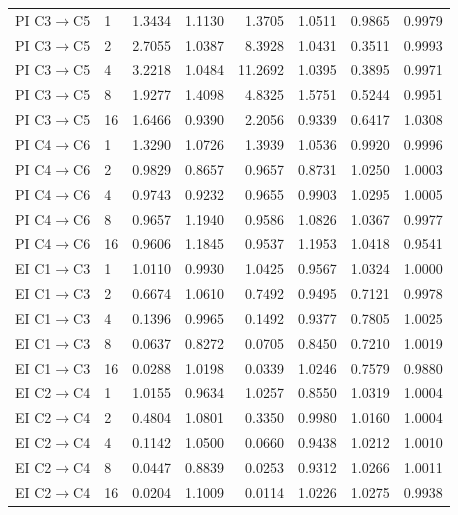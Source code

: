 \begin{table}[p]
\begin{tabular*}{\linewidth}{@{\extracolsep{\fill}}llrrrrrr@{}}
\midrule
PI C3$\to$C5 & 1 & 1.3434 & 1.1130 & 1.3705 & 1.0511 & 0.9865 & 0.9979\\
PI C3$\to$C5 & 2 & 2.7055 & 1.0387 & 8.3928 & 1.0431 & 0.3511 & 0.9993\\
PI C3$\to$C5 & 4 & 3.2218 & 1.0484 & 11.2692 & 1.0395 & 0.3895 & 0.9971\\
PI C3$\to$C5 & 8 & 1.9277 & 1.4098 & 4.8325 & 1.5751 & 0.5244 & 0.9951\\
PI C3$\to$C5 & 16 & 1.6466 & 0.9390 & 2.2056 & 0.9339 & 0.6417 & 1.0308\\
\midrule
PI C4$\to$C6 & 1 & 1.3290 & 1.0726 & 1.3939 & 1.0536 & 0.9920 & 0.9996\\
PI C4$\to$C6 & 2 & 0.9829 & 0.8657 & 0.9657 & 0.8731 & 1.0250 & 1.0003\\
PI C4$\to$C6 & 4 & 0.9743 & 0.9232 & 0.9655 & 0.9903 & 1.0295 & 1.0005\\
PI C4$\to$C6 & 8 & 0.9657 & 1.1940 & 0.9586 & 1.0826 & 1.0367 & 0.9977\\
PI C4$\to$C6 & 16 & 0.9606 & 1.1845 & 0.9537 & 1.1953 & 1.0418 & 0.9541\\
\midrule
EI C1$\to$C3 & 1 & 1.0110 & 0.9930 & 1.0425 & 0.9567 & 1.0324 & 1.0000\\
EI C1$\to$C3 & 2 & 0.6674 & 1.0610 & 0.7492 & 0.9495 & 0.7121 & 0.9978\\
EI C1$\to$C3 & 4 & 0.1396 & 0.9965 & 0.1492 & 0.9377 & 0.7805 & 1.0025\\
EI C1$\to$C3 & 8 & 0.0637 & 0.8272 & 0.0705 & 0.8450 & 0.7210 & 1.0019\\
EI C1$\to$C3 & 16 & 0.0288 & 1.0198 & 0.0339 & 1.0246 & 0.7579 & 0.9880\\
\midrule
EI C2$\to$C4 & 1 & 1.0155 & 0.9634 & 1.0257 & 0.8550 & 1.0319 & 1.0004\\
EI C2$\to$C4 & 2 & 0.4804 & 1.0801 & 0.3350 & 0.9980 & 1.0160 & 1.0004\\
EI C2$\to$C4 & 4 & 0.1142 & 1.0500 & 0.0660 & 0.9438 & 1.0212 & 1.0010\\
EI C2$\to$C4 & 8 & 0.0447 & 0.8839 & 0.0253 & 0.9312 & 1.0266 & 1.0011\\
EI C2$\to$C4 & 16 & 0.0204 & 1.1009 & 0.0114 & 1.0226 & 1.0275 & 0.9938\\
\bottomrule
\end{tabular*}
\end{table}

